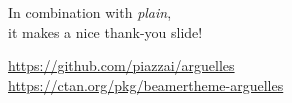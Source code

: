\documentclass[compress,12pt]{beamer}
\begin{document}
\End
\begin{frame}
      \centering
      In combination with \textit{plain}, \\
      it makes a nice thank-you slide!
      \vfill
      \scalebox{4}{\faGithub} \par\bigskip
      \url{https://github.com/piazzai/arguelles} \\
      \url{https://ctan.org/pkg/beamertheme-arguelles}
\end{frame}
\end{document}
